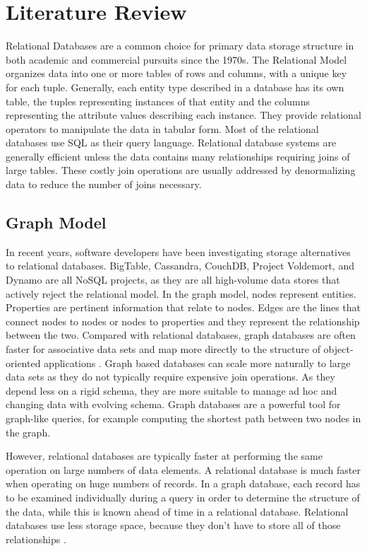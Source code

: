 \documentclass[12pt, oneside]{book}
\begin{document}
\chapter{Literature Review}
Relational Databases are a common choice for primary data storage structure in both academic and commercial pursuits since the 1970s. The Relational Model organizes data into one or more tables of rows and columns, with a unique key for each tuple. Generally, each entity type described in a database has its own table, the tuples representing instances of that entity and the columns representing the attribute values describing each instance. They provide relational operators to manipulate the data in tabular form. Most of the relational databases use SQL as their query language. Relational database systems are generally efficient unless the data contains many relationships requiring joins of large tables. These costly join operations are usually addressed by denormalizing data to reduce the number of joins necessary.  
\section{Graph Model}
In recent years, software developers have been investigating storage alternatives to relational databases. BigTable, Cassandra, CouchDB, Project Voldemort, and Dynamo are all NoSQL projects, as they are all high-volume data stores that actively reject the relational model. In the graph model, nodes represent entities. Properties are pertinent information that relate to nodes. Edges are the lines that connect nodes to nodes or nodes to properties and they represent the relationship between the two. Compared with relational databases, graph databases are often faster for associative data sets and map more directly to the structure of object-oriented applications \cite{object_graph}. Graph based databases can scale more naturally to large data sets as they do not typically require expensive join operations. As they depend less on a rigid schema, they are more suitable to manage ad hoc and changing data with evolving schema. Graph databases are a powerful tool for graph-like queries, for example computing the shortest path between two nodes in the graph.\\
\par
However, relational databases are typically faster at performing the same operation on large numbers of data elements. A relational database is much faster when operating on huge numbers of records. In a graph database, each record has to be examined individually during a query in order to determine the structure of the data, while this is known ahead of time in a relational database. Relational databases use less storage space, because they don't have to store all of those relationships \cite{graph_relational_comparison}.
\end{document}

